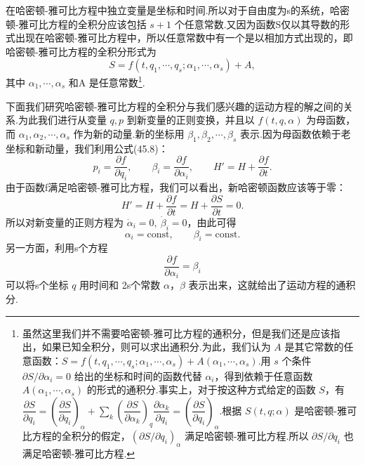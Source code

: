 在哈密顿-雅可比方程中独立变量是坐标和时间.所以对于自由度为s的系统，哈密顿-雅可比方程的全积分应该包括
$s+1$
个任意常数.又因为函数S仅以其导数的形式出现在哈密顿-雅可比方程中，所以任意常数中有一个是以相加方式出现的，即哈密顿-雅可比方程的全积分形式为
\begin{equation}
  S=f(t,q_1,\cdots,q_s;\alpha_1,\cdots,\alpha_s)+A,
\end{equation}
其中 $\alpha_1,\cdots,\alpha_s$ 和A 是任意常数\footnote{虽然这里我们并不需要哈密顿-雅可比方程的通积分，但是我们还是应该指出，如果已知全积分，则可以求出通积分.为此，我们认为 $A$ 是其它常数的任意函数：$S=f(t,q_1,\cdots,q_s;\alpha_1,\cdots,\alpha_s)+A(\alpha_1,\cdots,\alpha_s)$.用 $s$ 个条件 $\partial S/\partial\alpha_i=0$ 给出的坐标和时间的函数代替 $\alpha_i$，得到依赖于任意函数 $A(\alpha_1,\cdots,\alpha_s)$ 的形式的通积分.事实上，对于按这种方式给定的函数 $S$，有 $\dfrac{\partial S}{\partial q_i}=\left(\dfrac{\partial S}{\partial q_i}\right)_\alpha+\sum_k\left(\dfrac{\partial S}{\partial\alpha_k}\right)_q\dfrac{\partial\alpha_k}{\partial q_i}=\left(\dfrac{\partial S}{\partial q_i}\right)_\alpha$.根据 $S(t,q;\alpha)$ 是哈密顿-雅可比方程的全积分的假定，$\left(\partial S/\partial q_i\right)_\alpha$ 满足哈密顿-雅可比方程.所以 $\partial S/\partial q_i$ 也满足哈密顿-雅可比方程.}.

下面我们研究哈密顿-雅可比方程的全积分与我们感兴趣的运动方程的解之间的关系.为此我们进行从变量
$q,p$ 到新变量的正则变换，并且以 $f(t,q,\alpha)$ 为母函数，而
$\alpha_1,\alpha_2,\cdots,\alpha_s$
作为新的动量.新的坐标用 $\beta_1,\beta_2,\cdots,\beta_s$
表示.因为母函数依赖于老坐标和新动量，我们利用公式(45.8)：
\begin{equation*}
  p_i=\frac{\partial f}{\partial q_i},\qquad
  \beta_i=\frac{\partial f}{\partial\alpha_i},\qquad
  H'=H+\frac{\partial f}{\partial t}.
\end{equation*}
由于函数f满足哈密顿-雅可比方程，我们可以看出，新哈密顿函数应该等于零：
\begin{equation*}
  H'=H+\frac{\partial f}{\partial t}=H+\frac{\partial S}{\partial t}=0.
\end{equation*}
所以对新变量的正则方程为 $\dot{\alpha}_i=0,\ \dot{\beta}_i=0$，由此可得
\begin{equation}
  \alpha_i=\mathrm{const},\qquad \beta_i=\mathrm{const.}
\end{equation}
另一方面，利用s个方程
\begin{equation*}
  \frac{\partial f}{\partial\alpha_i}=\beta_i
\end{equation*}
可以将s个坐标 $q$
用时间和 2s个常数 $\alpha$，$\beta$
表示出来，这就给出了运动方程的通积分.

